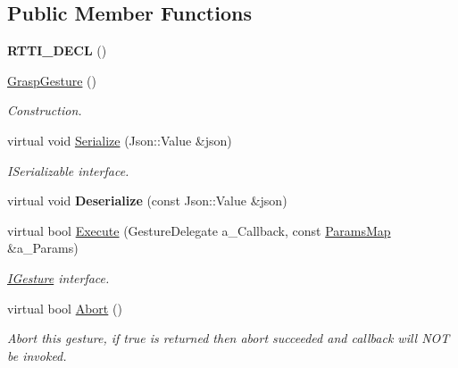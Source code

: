 \subsection*{Public Member Functions}
\begin{DoxyCompactItemize}
\item 
\mbox{\label{class_grasp_gesture_a41814ebf71c5f39722a78b3a1546fd3f}} 
{\bfseries R\+T\+T\+I\+\_\+\+D\+E\+CL} ()
\item 
\mbox{\label{class_grasp_gesture_aaeabee09e5f8e5be11b745bbc9ffb49c}} 
\hyperlink{class_grasp_gesture_aaeabee09e5f8e5be11b745bbc9ffb49c}{Grasp\+Gesture} ()
\begin{DoxyCompactList}\small\item\em Construction. \end{DoxyCompactList}\item 
\mbox{\label{class_grasp_gesture_ab2871c8df7e702d4dd1a1b4878524091}} 
virtual void \hyperlink{class_grasp_gesture_ab2871c8df7e702d4dd1a1b4878524091}{Serialize} (Json\+::\+Value \&json)
\begin{DoxyCompactList}\small\item\em I\+Serializable interface. \end{DoxyCompactList}\item 
\mbox{\label{class_grasp_gesture_a541b2ec489aa0533ff195e4f0f614ebb}} 
virtual void {\bfseries Deserialize} (const Json\+::\+Value \&json)
\item 
\mbox{\label{class_grasp_gesture_adc88ab16d6d3bcbbbc06ea89b416f8b1}} 
virtual bool \hyperlink{class_grasp_gesture_adc88ab16d6d3bcbbbc06ea89b416f8b1}{Execute} (Gesture\+Delegate a\+\_\+\+Callback, const \hyperlink{class_params_map}{Params\+Map} \&a\+\_\+\+Params)
\begin{DoxyCompactList}\small\item\em \hyperlink{class_i_gesture}{I\+Gesture} interface. \end{DoxyCompactList}\item 
\mbox{\label{class_grasp_gesture_a85046e956cc579cf22bd8f2ec0b03640}} 
virtual bool \hyperlink{class_grasp_gesture_a85046e956cc579cf22bd8f2ec0b03640}{Abort} ()
\begin{DoxyCompactList}\small\item\em Abort this gesture, if true is returned then abort succeeded and callback will N\+OT be invoked. \end{DoxyCompactList}\end{DoxyCompactItemize}
